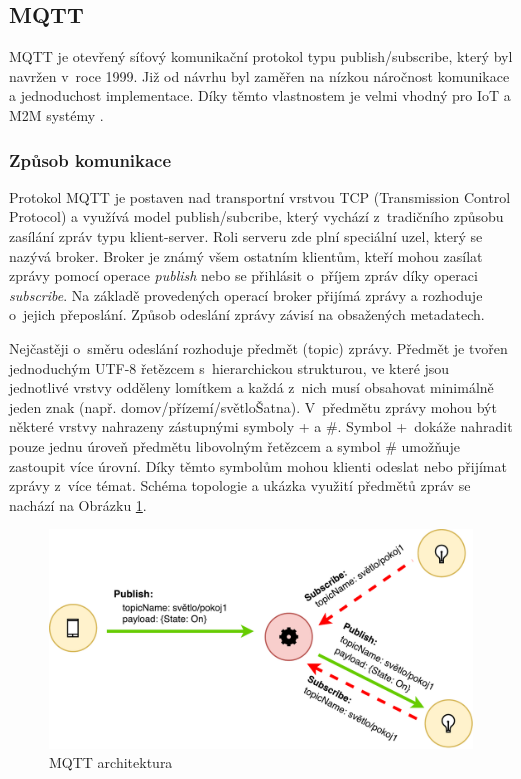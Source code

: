 \subsection{MQTT}
  MQTT je otevřený síťový komunikační protokol typu publish/subscribe, který byl navržen
  v~roce 1999. Již od návrhu byl zaměřen na nízkou náročnost komunikace a jednoduchost
  implementace. Díky těmto vlastnostem je velmi vhodný pro IoT a M2M systémy \cite{mqtt}.
  \subsubsection{Způsob komunikace}
  
  Protokol MQTT je postaven nad transportní vrstvou TCP (Transmission Control Protocol)
  a využívá model publish/subcribe, který vychází z~tradičního způsobu zasílání zpráv
  typu klient-server. Roli serveru zde plní speciální uzel, který se nazývá broker.
  Broker je známý všem ostatním klientům, kteří mohou zasílat zprávy pomocí operace
  \textit{publish} nebo se přihlásit o~příjem zpráv díky operaci \textit{subscribe}.
  Na základě provedených operací broker přijímá zprávy a rozhoduje o~jejich přeposlání.
  Způsob odeslání zprávy závisí na obsažených metadatech.
  
  Nejčastěji o~směru odeslání rozhoduje předmět (topic) zprávy. Předmět je tvořen
  jednoduchým UTF-8 řetězcem s~hierarchickou strukturou, ve které jsou jednotlivé
  vrstvy odděleny lomítkem a každá z~nich musí obsahovat minimálně jeden
  znak (např. domov/přízemí/světloŠatna). V~předmětu
  zprávy mohou být některé vrstvy nahrazeny zástupnými symboly + a \#. Symbol +~dokáže
  nahradit pouze jednu úroveň předmětu libovolným řetězcem a symbol \# umožňuje
  zastoupit více úrovní. Díky těmto symbolům mohou klienti odeslat nebo přijímat
  zprávy z~více témat. Schéma topologie a ukázka využití předmětů zpráv se nachází na 
  Obrázku \ref{obr.mqtt-arch}.
  
  \begin{figure}[ht]
\begin{center}
\includegraphics[scale=0.41]{pictures/mqtt-arch}
\caption{MQTT architektura}
\label{obr.mqtt-arch}
\end{center}
\end{figure}
  
